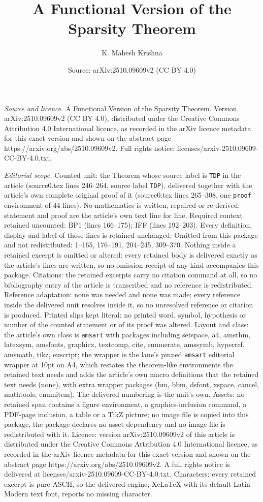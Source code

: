 \documentclass[10pt,a4paper]{amsart}
\title[A Functional Version of the Sparsity Theorem]{A Functional Version of the Sparsity Theorem}
\author{K. Mahesh Krishna}
\date{Source: arXiv:2510.09609v2 (CC BY 4.0)}
\begin{document}
\maketitle

\noindent\emph{Source and licence.} A Functional Version of the Sparsity Theorem. Version arXiv:2510.09609v2 (CC BY 4.0), distributed under the Creative Commons Attribution 4.0 International licence, as recorded in the arXiv licence metadata for this exact version and shown on the abstract page https://arxiv.org/abs/2510.09609v2. Full rights notice: licenses/arxiv-2510.09609-CC-BY-4.0.txt.\par\smallskip

\noindent\textit{Editorial scope.} Counted unit: the Theorem whose source label is \texttt{TDP} in the article (source0.tex lines 246--264, source label \texttt{TDP}), delivered together with the article's own complete original proof of it (source0.tex lines 265--308, one \texttt{proof} environment of 44 lines). No mathematics is written, repaired or re-derived: statement and proof are the article's own text line for line. Required context retained uncounted: BP1 (lines 166--175); IFF (lines 192--203). Every definition, display and label of those lines is retained unchanged. Omitted from this package and not redistributed: 1--165, 176--191, 204--245, 309--370. Nothing inside a retained excerpt is omitted or altered: every retained body is delivered exactly as the article's lines are written, so no omission receipt of any kind accompanies this package. Citations: the retained excerpts carry no citation command at all, so no bibliography entry of the article is transcribed and no reference is redistributed. Reference adaptation: none was needed and none was made; every reference inside the delivered unit resolves inside it, so no unresolved reference or citation is produced. Printed slips kept literal: no printed word, symbol, hypothesis or number of the counted statement or of its proof was altered. Layout and class: the article's own class is \texttt{amsart} with packages including setspace, a4, amsthm, latexsym, amsfonts, graphicx, textcomp, cite, enumerate, amssymb, hyperref, amsmath, tikz, euscript; the wrapper is the lane's pinned \texttt{amsart} editorial wrapper at 10pt on A4, which restates the theorem-like environments the retained text needs and adds the article's own macro definitions that the retained text needs (none), with extra wrapper packages (bm, bbm, dsfont, xspace, cancel, mathtools, enumitem). The delivered numbering is the unit's own. Assets: no retained span contains a figure environment, a graphics-inclusion command, a PDF-page inclusion, a table or a TikZ picture; no image file is copied into this package, the package declares no asset dependency and no image file is redistributed with it. Licence: version arXiv:2510.09609v2 of this article is distributed under the Creative Commons Attribution 4.0 International licence, as recorded in the arXiv licence metadata for this exact version and shown on the abstract page https://arxiv.org/abs/2510.09609v2. A full rights notice is delivered at licenses/arxiv-2510.09609-CC-BY-4.0.txt. Characters: every retained excerpt is pure ASCII, so the delivered engine, XeLaTeX with its default Latin Modern text font, reports no missing character.
\end{document}
